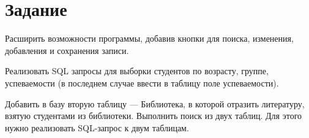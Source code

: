 \section{Задание}

Расширить возможности программы, добавив кнопки для поиска, изменения,
 добавления и сохранения записи.

Реализовать SQL запросы для выборки студентов по возрасту, группе,
успеваемости (в последнем случае ввести в таблицу поле успеваемости).

Добавить в базу вторую таблицу –-- Библиотека, в которой отразить литературу,
взятую студентами из библиотеки. Выполнить поиск из двух таблиц.
Для этого нужно реализовать SQL-запрос к двум таблицам.